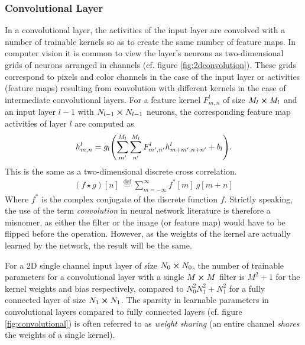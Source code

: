\subsubsection{Convolutional Layer}
In a convolutional layer, the activities of the input layer are convolved with a number of trainable kernels so as to create the same number of feature maps. In computer vision it is common to view the layer's neurons as two-dimensional grids of neurons arranged in channels (cf. figure \ref{fig:2dconvolution}). These grids correspond to pixels and color channels in the case of the input layer or activities (feature maps) resulting from convolution with different kernels in the case of intermediate convolutional layers. For a feature kernel $F_{m,n}^l$ of size $M_l\cp M_l$ and an input layer $l-1$ with $N_{l-1}\cp N_{l-1}$ neurons, the corresponding feature map activities of layer $l$ are computed as
\begin{align}
    h^l_{m,n} = g_l\qty(\sum_{m'}^{M_l}\sum_{n'}^{M_l}F_{m',n'}^l h_{m+m',n+n'}^l+b_l).
    \label{eq:2dconv}
\end{align}
This is the same as a two-dimensional discrete cross correlation.
\begin{align}
    (f \star g)[n]\ \stackrel{\mathrm{def}}{=} \sum_{m=-\infty}^{\infty} f^*[m]\ g[m+n]
\end{align}
Where $f^*$ is the complex conjugate of the discrete function $f$. Strictly speaking, the use of the term \emph{convolution} in neural network literature is therefore a misnomer, as either the filter or the image (or feature map) would have to be flipped before the operation. However, as the weights of the kernel are actually learned by the network, the result will be the same. 

For a 2D single channel input layer of size $N_0\cp N_0$, the number of trainable parameters for a convolutional layer with a single $M\cp M$ filter is $M^2 + 1$ for the kernel weights and bias respectively, compared to $N_0^2N_1^2+N_1^2$ for a fully connected layer of size $N_1\cp N_1$. The sparsity in learnable parameters in convolutional layers compared to fully connected layers (cf. figure \ref{fig:convolutional}) is often referred to as \emph{weight sharing} (an entire channel \emph{shares} the weights of a single kernel).

